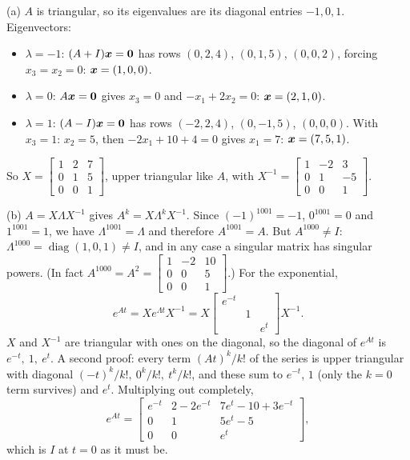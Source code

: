 \begin{solution}
(a) $A$ is triangular, so its eigenvalues are its diagonal entries $-1,0,1$. Eigenvectors:
\begin{itemize}
\item $\lambda=-1$: $(A+I)\boldsymbol{x}=\boldsymbol{0}$ has rows $(0,2,4)$, $(0,1,5)$, $(0,0,2)$, forcing $x_3=x_2=0$: $\boldsymbol{x}=(1,0,0)$.
\item $\lambda=0$: $A\boldsymbol{x}=\boldsymbol{0}$ gives $x_3=0$ and $-x_1+2x_2=0$: $\boldsymbol{x}=(2,1,0)$.
\item $\lambda=1$: $(A-I)\boldsymbol{x}=\boldsymbol{0}$ has rows $(-2,2,4)$, $(0,-1,5)$, $(0,0,0)$. With $x_3=1$: $x_2=5$, then $-2x_1+10+4=0$ gives $x_1=7$: $\boldsymbol{x}=(7,5,1)$.
\end{itemize}
So $X=\begin{bmatrix}1&2&7\\0&1&5\\0&0&1\end{bmatrix}$, upper triangular like $A$, with $X^{-1}=\begin{bmatrix}1&-2&3\\0&1&-5\\0&0&1\end{bmatrix}$.

(b) $A=X\Lambda X^{-1}$ gives $A^{k}=X\Lambda^{k}X^{-1}$. Since $(-1)^{1001}=-1$, $0^{1001}=0$ and $1^{1001}=1$, we have $\Lambda^{1001}=\Lambda$ and therefore $A^{1001}=A$. But $A^{1000}\neq I$: $\Lambda^{1000}=\operatorname{diag}(1,0,1)\neq I$, and in any case a singular matrix has singular powers. (In fact $A^{1000}=A^{2}=\begin{bmatrix}1&-2&10\\0&0&5\\0&0&1\end{bmatrix}$.) For the exponential,
\[
e^{At}=Xe^{\Lambda t}X^{-1}=X\begin{bmatrix}e^{-t}&&\\&1&\\&&e^{t}\end{bmatrix}X^{-1}.
\]
$X$ and $X^{-1}$ are triangular with ones on the diagonal, so the diagonal of $e^{At}$ is $e^{-t},\ 1,\ e^{t}$. A second proof: every term $(At)^{k}/k!$ of the series is upper triangular with diagonal $(-t)^{k}/k!,\ 0^{k}/k!,\ t^{k}/k!$, and these sum to $e^{-t}$, $1$ (only the $k=0$ term survives) and $e^{t}$. Multiplying out completely,
\[
e^{At}=\begin{bmatrix}e^{-t}&2-2e^{-t}&7e^{t}-10+3e^{-t}\\0&1&5e^{t}-5\\0&0&e^{t}\end{bmatrix},
\]
which is $I$ at $t=0$ as it must be.


\end{solution}

